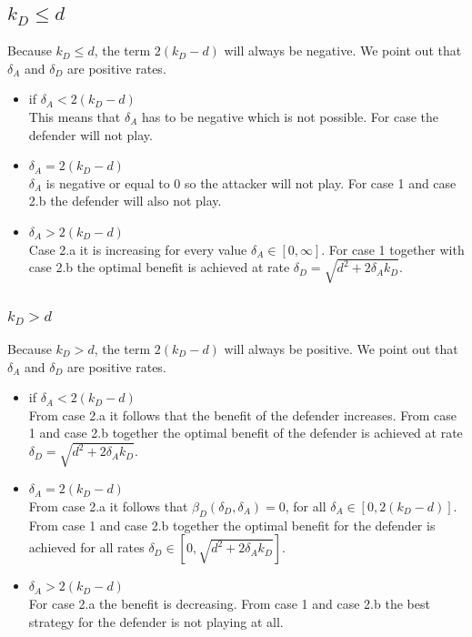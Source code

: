 \subsection*{$k_{D} \leq d$}
Because $k_{D} \leq d$, the term $2(k_{D} - d)$ will always be negative. We point out that $\delta_{A}$ and $\delta_{D}$ are positive rates. 
\begin{itemize}
\item if $\delta_{A} < 2(k_{D} - d)$ \\
This means that $\delta_{A}$ has to be negative which is not possible. For case the defender will not play.
\item $\delta_{A} = 2(k_{D} - d)$ \\
$\delta_{A}$ is negative or equal to 0 so the attacker will not play. For case 1 and case 2.b the defender will also not play.
\item $\delta_{A} > 2(k_{D} - d)$ \\
Case 2.a it is increasing for every value $\delta_{A} \in [0,\infty]$.  For case 1 together with case 2.b the optimal benefit is achieved at rate $\delta_{D} = \sqrt{d^{2} + 2\delta_{A}k_{D}}$.
\end{itemize}


\subsubsection{$k_{D} > d$}
Because $k_{D} > d$, the term $2(k_{D} - d)$ will always be positive. We point out that $\delta_{A}$ and $\delta_{D}$ are positive rates.
\begin{itemize}
\item if $\delta_{A} < 2(k_{D} - d)$ \\
From case 2.a it follows that the benefit of the defender increases. From case 1 and case 2.b together the optimal benefit of the defender is achieved at rate $\delta_{D} = \sqrt{d^{2} + 2\delta_{A}k_{D}}$.
\item $\delta_{A} = 2(k_{D} - d)$ \\
From case 2.a it follows that $\beta_{D}(\delta_{D},\delta_{A})=0$, for all $\delta_{A} \in [0,2(k_{D} - d)]$. From case 1 and case 2.b together the optimal benefit for the defender is achieved for all rates $\delta_{D} \in [0, \sqrt{d^{2} + 2\delta_{A}k_{D}}]$.
\item $\delta_{A} > 2(k_{D} - d)$ \\
For case 2.a the benefit is decreasing. From case 1 and case 2.b the best strategy for the defender is not playing at all. 
\end{itemize}

